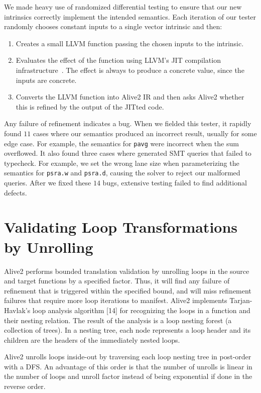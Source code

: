 We made heavy use of randomized differential testing to ensure that
our new intrinsics correctly implement the intended semantics.
%
Each iteration of our tester randomly chooses constant inputs to a
single vector intrinsic and then:
%
\begin{enumerate}
\item
  Creates a small LLVM function passing the chosen inputs to the
  intrinsic.
\item
  Evaluates the effect of the function using LLVM's JIT compilation
  infrastructure~\cite{orc}. The effect is always to produce a
  concrete value, since the inputs are concrete.
\item
  Converts the LLVM function into Alive2 IR and then asks Alive2
  whether this is refined by the output of the JITted code.
\end{enumerate}
%
Any failure of refinement indicates a bug.
%
When we fielded this tester, it rapidly found $11$ cases
where our semantics produced an incorrect result, usually for
some edge case.
%
For example, the semantics for \texttt{pavg} were incorrect when the
sum overflowed.
%
It also found three cases where \minotaur{} generated SMT queries that
failed to typecheck.
%
For example, we set the wrong lane size when parameterizing the
semantics for \texttt{psra.w} and \texttt{psra.d}, causing the solver
to reject our malformed queries.
%
After we fixed these $14$ bugs, extensive testing failed to find
additional defects.



\section {Validating Loop Transformations by Unrolling}

Alive2 performs bounded translation validation by unrolling loops in
the source and target functions by a specified factor. Thus, it will
find any failure of refinement that is triggered within the specified
bound, and will miss refinement failures that require more loop
iterations to manifest. Alive2 implements Tarjan-Havlak’s loop
analysis algorithm [14] for recognizing the loops in a function and
their nesting relation. The result of the analysis is a loop nesting
forest (a collection of trees). In a nesting tree, each node
represents a loop header and its children are the headers of the
immediately nested loops.

Alive2 unrolls loops inside-out by traversing each loop nesting tree
in post-order with a DFS. An advantage of this order is that the
number of unrolls is linear in the number of loops and unroll factor
instead of being exponential if done in the reverse order.

